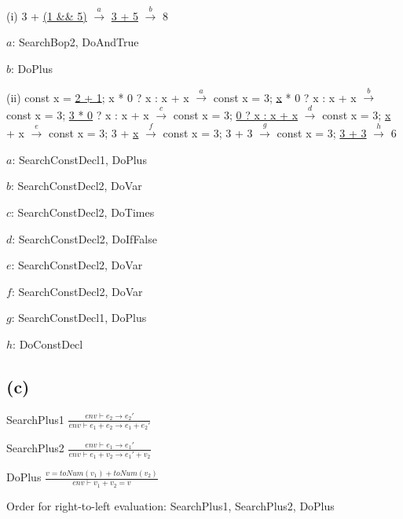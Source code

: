 \documentclass[11pt, oneside]{article}
\let\emptyset\varnothing
\newcommand{\forceindent}{\leavevmode{\parindent=1.5em\indent}}
\begin{document}
\forceindent \par (i) 3 + \underline{(1 \&\& 5)} $\xrightarrow{a}$ \underline{3 + 5} $\xrightarrow{b}$ 8
\par $a$: SearchBop2, DoAndTrue
\par $b$: DoPlus

\vspace{1.5\baselineskip}



\par (ii) const x =
 \underline{2 + 1}; x * 0 ? x : x + x $\xrightarrow{a}$ 
 const x = 3; \underline{x} * 0 ? x : x + x $\xrightarrow{b}$
 const x = 3; \underline{3 * 0} ? x : x + x $\xrightarrow{c}$
 const x = 3; \underline{0 ? x : x + x} $\xrightarrow{d}$
 const x = 3; \underline{x} + x $\xrightarrow{e}$
 const x = 3; 3 + \underline{x} $\xrightarrow{f}$
  const x = 3; 3 + 3 $\xrightarrow{g}$
 const x = 3; \underline{3 + 3} $\xrightarrow{h}$
 6
\par $a$: SearchConstDecl1, DoPlus
\par $b$: SearchConstDecl2, DoVar
\par $c$: SearchConstDecl2, DoTimes
\par $d$: SearchConstDecl2, DoIfFalse
\par $e$: SearchConstDecl2, DoVar
\par $f$: SearchConstDecl2, DoVar
\par $g$: SearchConstDecl1, DoPlus
\par $h$: DoConstDecl

\subsection*{(c)}
\forceindent \par 
\par SearchPlus1
$
\frac{
	env \vdash e_2 \rightarrow e_2'
}
{
	env \vdash e_1 + e_2 \rightarrow e_1 + e_2'
}
$
\par SearchPlus2
$
\frac{
	env \vdash e_1 \rightarrow e_1'
}
{
	env \vdash e_1 + v_2 \rightarrow e_1' + v_2
}
$
\par DoPlus
$
\frac{
	v = toNum(v_1) + toNum(v_2)
}
{
	env \vdash v_1 + v_2 = v
}
$
\par Order for right-to-left evaluation: SearchPlus1, SearchPlus2, DoPlus
\end{document}
